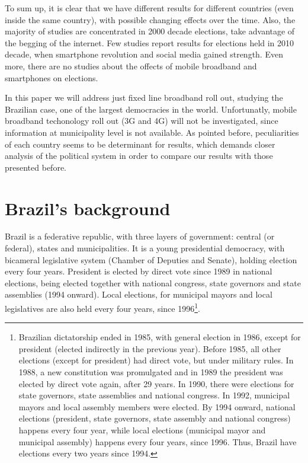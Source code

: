 \documentclass[12pt,]{article}
\let\rmarkdownfootnote\footnote%
\def\footnote{\protect\rmarkdownfootnote}
\begin{document}
To sum up, it is clear that we have different results for different
countries (even inside the same country), with possible changing effects
over the time. Also, the majority of studies are concentrated in 2000
decade elections, take advantage of the begging of the internet. Few
studies report results for elections held in 2010 decade, when
smartphone revolution and social media gained strength. Even more, there
are no studies about the offects of mobile broadband and smartphones on
elections.

In this paper we will address just fixed line broadband roll out,
studying the Brazilian case, one of the largest democracies in the
world. Unfortunatly, mobile broadband techonology roll out (3G and 4G)
will not be investigated, since information at municipality level is not
available. As pointed before, peculiarities of each country seems to be
determinant for results, which demands closer analysis of the political
system in order to compare our results with those presented before.

\hypertarget{brazils-background}{%
\section{Brazil's background}\label{brazils-background}}

Brazil is a federative republic, with three layers of government:
central (or federal), states and municipalities. It is a young
presidential democracy, with bicameral legislative system (Chamber of
Deputies and Senate), holding election every four years. President is
elected by direct vote since 1989 in national elections, being elected
together with national congress, state governors and state assemblies
(1994 onward). Local elections, for municipal mayors and local
legislatives are also held every four years, since 1996\footnote{Brazilian
  dictatorship ended in 1985, with general election in 1986, except for
  president (elected indirectly in the previous year). Before 1985, all
  other elections (except for president) had direct vote, but under
  military rules. In 1988, a new constitution was promulgated and in
  1989 the president was elected by direct vote again, after 29 years.
  In 1990, there were elections for state governors, state assemblies
  and national congress. In 1992, municipal mayors and local assembly
  members were elected. By 1994 onward, national elections (president,
  state governors, state assembly and national congress) happens every
  four year, while local elections (municipal mayor and municipal
  assembly) happens every four years, since 1996. Thus, Brazil have
  elections every two years since 1994.}.
\end{document}
